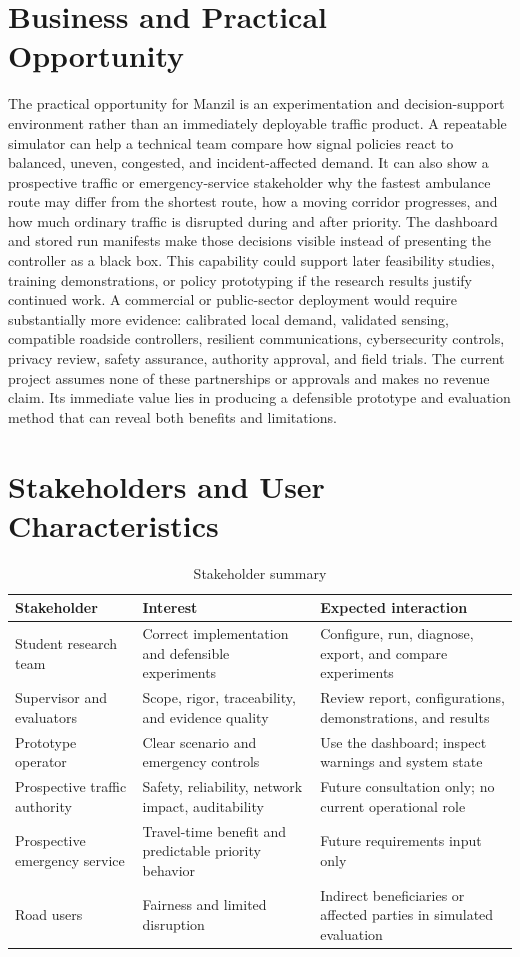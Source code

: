 \section{Business and Practical Opportunity}

The practical opportunity for Manzil is an experimentation and decision-support environment rather than an immediately deployable traffic product. A repeatable simulator can help a technical team compare how signal policies react to balanced, uneven, congested, and incident-affected demand. It can also show a prospective traffic or emergency-service stakeholder why the fastest ambulance route may differ from the shortest route, how a moving corridor progresses, and how much ordinary traffic is disrupted during and after priority. The dashboard and stored run manifests make those decisions visible instead of presenting the controller as a black box. This capability could support later feasibility studies, training demonstrations, or policy prototyping if the research results justify continued work. A commercial or public-sector deployment would require substantially more evidence: calibrated local demand, validated sensing, compatible roadside controllers, resilient communications, cybersecurity controls, privacy review, safety assurance, authority approval, and field trials. The current project assumes none of these partnerships or approvals and makes no revenue claim. Its immediate value lies in producing a defensible prototype and evaluation method that can reveal both benefits and limitations.

\section{Stakeholders and User Characteristics}

\begin{table}[htbp]
\centering
\caption{Stakeholder summary}
\label{tab:stakeholders}
\begin{tabularx}{\textwidth}{p{}YY}
\toprule
\textbf{Stakeholder} & \textbf{Interest} & \textbf{Expected interaction}\\
\midrule
Student research team & Correct implementation and defensible experiments & Configure, run, diagnose, export, and compare experiments\\
Supervisor and evaluators & Scope, rigor, traceability, and evidence quality & Review report, configurations, demonstrations, and results\\
Prototype operator & Clear scenario and emergency controls & Use the dashboard; inspect warnings and system state\\
Prospective traffic authority & Safety, reliability, network impact, auditability & Future consultation only; no current operational role\\
Prospective emergency service & Travel-time benefit and predictable priority behavior & Future requirements input only\\
Road users & Fairness and limited disruption & Indirect beneficiaries or affected parties in simulated evaluation\\
\bottomrule
\end{tabularx}
\end{table}

